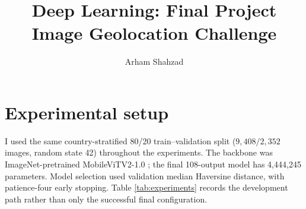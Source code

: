 \documentclass[10pt]{article}
\title{Deep Learning: Final Project\\
Image Geolocation Challenge}
\author{Arham Shahzad}
\date{}
\begin{document}
\maketitle
\vspace{-1.5em}

\section*{Experimental setup}

I used the same country-stratified 80/20 train--validation split
($9{,}408/2{,}352$ images, random state 42) throughout the experiments. The
backbone was ImageNet-pretrained MobileViTV2-1.0 \cite{mobilevitv2}; the final
108-output model has 4,444,245 parameters. Model selection used validation
median Haversine distance, with patience-four early stopping. Table
\ref{tab:experiments} records the development path rather than only the
successful final configuration.
\end{document}
